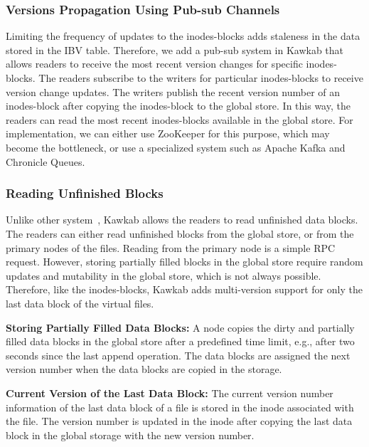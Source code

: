 \documentclass[]{article}
\newcommand{\subtopic}[1]{\vspace{1.5pt} \noindent \textbf{#1}}
\begin{document}
\subsubsection{Versions Propagation Using Pub-sub Channels}

Limiting the frequency of updates to the inodes-blocks adds staleness in the
data stored in the IBV table. Therefore, we add a pub-sub system in Kawkab that
allows readers to receive the most recent version changes for specific
inodes-blocks. The readers subscribe to the writers for particular
inodes-blocks to receive version change updates. The writers publish the recent
version number of an inodes-block after copying the inodes-block to the global
store. In this way, the readers can read the most recent inodes-blocks
available in the global store.
For implementation, we can either use ZooKeeper for this purpose, which may
become the bottleneck, or use a specialized system such as Apache Kafka and
Chronicle Queues.


\subsubsection{Reading Unfinished Blocks}

Unlike other system~\cite{}, Kawkab allows the readers to read unfinished data
blocks. The readers can either read unfinished blocks from the global store, or
from the primary nodes of the files. Reading from the primary node is a simple
RPC request. However, storing partially filled blocks in the global store
require random updates and mutability in the global store, which is not always
possible. Therefore, like the inodes-blocks, Kawkab adds multi-version support
for only the last data block of the virtual files.

\subtopic{Storing Partially Filled Data Blocks:}
A node copies the dirty and partially filled data blocks in the global store after
a predefined time limit, e.g., after two seconds since the last append operation.
The data blocks are assigned the next version number when the data blocks are copied 
in the storage. 

\subtopic{Current Version of the Last Data Block:} The current version number
information of the last data block of a file is stored in the inode associated
with the file. The version number is updated in the inode after copying the
last data block in the global storage with the new version number.
\end{document}
